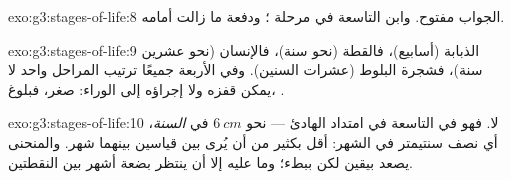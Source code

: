 \begin{solution}{exo:g3:stages-of-life:8}
الجواب مفتوح. وابن التاسعة في مرحلة ؛ ودفعة  ما
زالت أمامه.
\end{solution}

\begin{solution}{exo:g3:stages-of-life:9}
الذبابة (أسابيع)، فالقطة (نحو سنة)، فالإنسان (نحو عشرين سنة)،
فشجرة البلوط (عشرات السنين). وفي الأربعة جميعًا ترتيب المراحل
واحد لا يمكن قفزه ولا إجراؤه إلى الوراء: صغر، فبلوغ، .
\end{solution}

\begin{solution}{exo:g3:stages-of-life:10}
لا. فهو في التاسعة في امتداد  الهادئ --- نحو $\qty{6}{cm}$
في \emph{السنة}، أي نصف سنتيمتر في الشهر: أقل بكثير من أن يُرى بين
قياسين بينهما شهر. والمنحنى يصعد بيقين لكن ببطء؛ وما عليه إلا أن
ينتظر بضعة أشهر بين النقطتين.
\end{solution}

